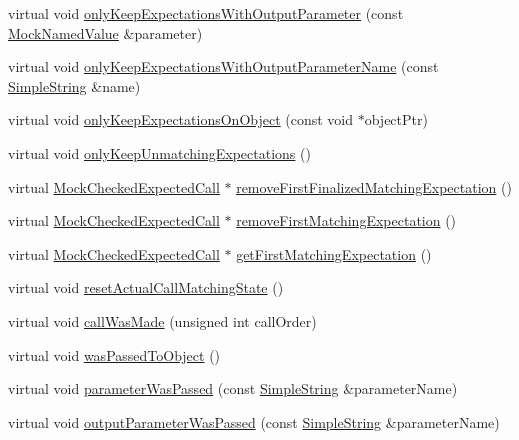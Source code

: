 \begin{DoxyCompactItemize}
\item 
virtual void \hyperlink{class_mock_expected_calls_list_a972b3fc801d32ecaf8039bd3206bb58e}{only\+Keep\+Expectations\+With\+Output\+Parameter} (const \hyperlink{class_mock_named_value}{Mock\+Named\+Value} \&parameter)
\item 
virtual void \hyperlink{class_mock_expected_calls_list_a592c38feae5b168c2e7303bc2cbeeeec}{only\+Keep\+Expectations\+With\+Output\+Parameter\+Name} (const \hyperlink{class_simple_string}{Simple\+String} \&name)
\item 
virtual void \hyperlink{class_mock_expected_calls_list_a4532e75c2db152553976d924441eba2a}{only\+Keep\+Expectations\+On\+Object} (const void $\ast$object\+Ptr)
\item 
virtual void \hyperlink{class_mock_expected_calls_list_a5fb8122e66b99f6e196b29a0f6f1bd28}{only\+Keep\+Unmatching\+Expectations} ()
\item 
virtual \hyperlink{class_mock_checked_expected_call}{Mock\+Checked\+Expected\+Call} $\ast$ \hyperlink{class_mock_expected_calls_list_a1a73fba9891c64207b06fb3f83fdad75}{remove\+First\+Finalized\+Matching\+Expectation} ()
\item 
virtual \hyperlink{class_mock_checked_expected_call}{Mock\+Checked\+Expected\+Call} $\ast$ \hyperlink{class_mock_expected_calls_list_ac8726365c168eec6edba33716889bc69}{remove\+First\+Matching\+Expectation} ()
\item 
virtual \hyperlink{class_mock_checked_expected_call}{Mock\+Checked\+Expected\+Call} $\ast$ \hyperlink{class_mock_expected_calls_list_ab6c35f9ece49ce41eae2d46ed7b94a1d}{get\+First\+Matching\+Expectation} ()
\item 
virtual void \hyperlink{class_mock_expected_calls_list_a4c7ee87e12972e0504de732ae6f90177}{reset\+Actual\+Call\+Matching\+State} ()
\item 
virtual void \hyperlink{class_mock_expected_calls_list_a6e2b7989a09a51036edbafebda0e012a}{call\+Was\+Made} (unsigned int call\+Order)
\item 
virtual void \hyperlink{class_mock_expected_calls_list_a9a3f1eec5ad45ccae942edb3073279de}{was\+Passed\+To\+Object} ()
\item 
virtual void \hyperlink{class_mock_expected_calls_list_a236efae763fa47a7df636a5e148b6c31}{parameter\+Was\+Passed} (const \hyperlink{class_simple_string}{Simple\+String} \&parameter\+Name)
\item 
virtual void \hyperlink{class_mock_expected_calls_list_ac2fed7fbbb6573c72c6bba4edcee4701}{output\+Parameter\+Was\+Passed} (const \hyperlink{class_simple_string}{Simple\+String} \&parameter\+Name)

\end{DoxyCompactItemize}
